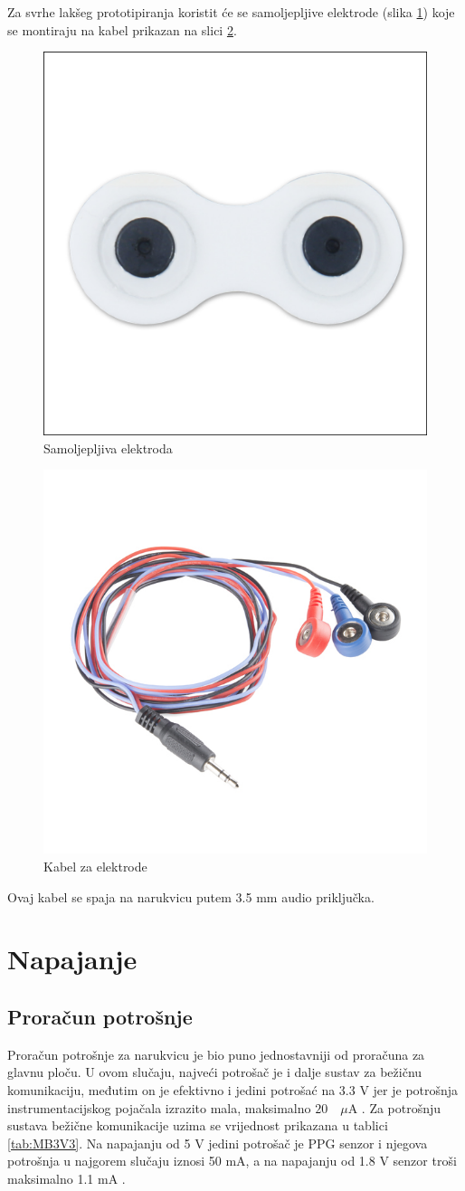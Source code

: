 Za svrhe lakšeg prototipiranja koristit će se samoljepljive elektrode (slika \ref{slk:ELECTRODE}) koje se montiraju na kabel prikazan na slici \ref{slk:CABLE}. 
\begin{figure}[htb]
    \centering
    \includegraphics[width=6 cm]{Figures/ELECTRODE-BOTTOM.jpg}
    \caption{Samoljepljiva elektroda}
    \label{slk:ELECTRODE}
\end{figure}
\begin{figure}
    \centering
    \includegraphics[width=6 cm]{Figures/CABLE.jpg}
    \caption{Kabel za elektrode}
    \label{slk:CABLE}
\end{figure}
Ovaj kabel se spaja na narukvicu putem 3.5 mm audio priključka.

\section{Napajanje}
\subsection{Proračun potrošnje}

Proračun potrošnje za narukvicu je bio puno jednostavniji od proračuna za glavnu ploču. U ovom slučaju, najveći potrošač je i dalje sustav za bežičnu komunikaciju, međutim on je efektivno i jedini potrošać na 3.3 V jer je potrošnja instrumentacijskog pojačala izrazito mala, maksimalno $20\quad \mu \textrm{A}$ \cite{ad:ad8226}. Za potrošnju sustava bežične komunikacije uzima se vrijednost prikazana u tablici \ref{tab:MB3V3}. Na napajanju od 5 V jedini potrošač je PPG senzor i njegova potrošnja u najgorem slučaju iznosi 50 mA, a na napajanju od 1.8 V senzor troši maksimalno 1.1 mA \cite{ad:max30101}.


